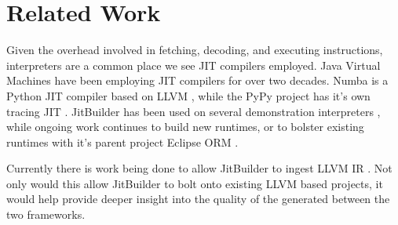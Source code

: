 \section{Related Work}
\label{sec:related-work}
Given the overhead involved in fetching, decoding, and executing instructions, interpreters are a common place we see JIT compilers employed.
Java Virtual Machines \cite{HiPerfJava,SuganumaIBMJit} have been employing JIT compilers for over two decades.
Numba is a Python JIT compiler based on LLVM \cite{numba,numbaWeb}, while the PyPy project has it's own tracing JIT \cite{pypy}.
JitBuilder has been used on several demonstration interpreters \cite{lua-vermhela, wasmjit}, while ongoing work continues to build new runtimes, or to bolster existing runtimes with it's parent project Eclipse ORM \cite{ruby-omr}.

Currently there is work being done to allow JitBuilder to ingest LLVM IR \cite{llvm-jitbuilder-interop}. 
Not only would this allow JitBuilder to bolt onto existing LLVM based projects, it would help provide deeper insight into the quality of the generated between the two frameworks.





